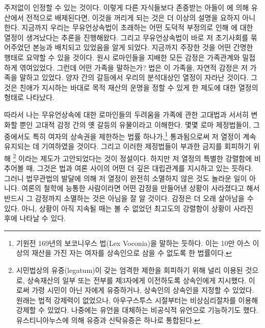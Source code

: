 주저없이 인정할 수 있는 것이다.
이렇게 다른 자식들보다 존중받는 아들이 에 의해
유산에서 전적으로 배제된다면,
이것을 꺼리게 되는 것은 더 이상의 설명을 요하지 아니한다.
지금까지
우리는
무유언상속법이 초래하는 어떤 도덕적 부정의로 인해
에 대한 열정이 생겨났다는 추론을 진행해왔다.
그리고 무유언상속법이 바로 저 초기사회를 묶어주었던 본능과
배치되고 있었음을 알게 되었다.
지금까지 주장한 것을 어떤 간명한 행태로 요약할 수 있을 것이다.
원시 로마인들을 지배한 모든 감정은
가족관계와 밀접하게 엮여있었다.
그런데 어떤 가족을 말하는가?
법은 이 가족을, 자연적 감정은 저 가족을 말하고 있었다.
양자 간의 갈등에서 우리의 분석대상인 열정이 자라난 것이다.
그것은
친애가 지시하는 바대로 목적 재산의 운명을 정할 수 있게 한 제도에 대한 열정의
형태로 나타났다.

따라서 나는 무유언상속에 대한 로마인들의 두려움을
가족에 관한 고대법과 서서히 변화할 뿐인 고대적 감정 간의 옛 갈등의 유물이라고
이해한다.
몇몇 로마 제정법들이, 그중에서도 특히
여자의 상속권을 제한하는 법률 하나가,\footnote{%
  기원전 169년의 보코니우스 법(Lex Voconia)을 말하는 듯하다.
  이는 10만 아스 이상의 재산을 가진 자는 여자를 상속인으로 삼을 수
  없도록 한 법률이다. }
통과됨으로써
저 열정이 계속 유지되는 데 기여하였을 것이다.
그리고 이러한 제정법들이 부과한 금지를 회피하기 위해
%
\footnote{시민법상의 유증(legatum)이 갖는 엄격한 제한을 회피하기 위해
  널리 이용된 것으로, 상속재산의 일부 또는 전부를 제3자에게 이전하도록
  상속인에게 지시했다.
  이로써 가령 시민이 아닌 자에게 유증하거나,
  상속인의 상속인을 지정할 수 있었다.
  원래는 법적 강제력이 없었으나,
  아우구스투스 시절부터는 비상심리절차를 이용해 강제할 수 있었다.
  나중에는 유언을 대체하는 비공식적 유언으로 기능하기도 했다.
  유스티니아누스에 의해 유증과 신탁유증은 하나로 통합된다. }%
이라는 제도가 고안되었다는 것이 정설이다.
하지만 저 열정의 특별한 강렬함에 비추어볼 때,
그것은 법과 여론 사이의 어떤 더 깊은 대립관계를 지시하고 있는 듯하다.
그러니 법무관법의 발달에 의해 저 열정이 완전히 소멸하지 않은 것도
놀라운 일이 아니다.
여론의 철학에 능통한 사람이라면
어떤 감정을 만들어낸 상황이 사라졌다고 해서 반드시
그 감정까지 소멸하는 것은 아님을 잘 알 것이다.
감정은 더 오래 살아남을 수 있다.
아니, 상황이 아직 지속될 때는 볼 수 없었던 최고도의 강렬함이
상황이 사라진 후에 나타날 수 있다.

